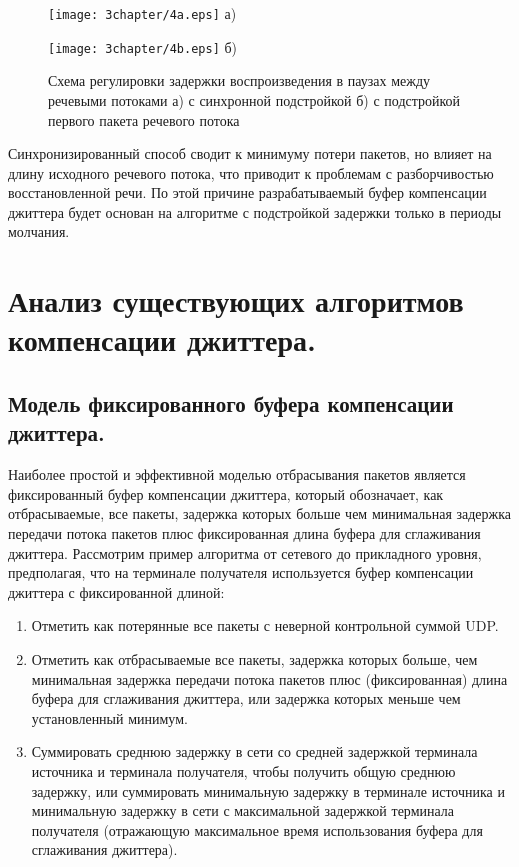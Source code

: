 \begin{figure} [!h]
\begin{minipage}[h]{0.85\linewidth}
\center
\texttt{[image: 3chapter/4a.eps]} а) \\
\end{minipage}
\vfill
\begin{minipage}[h]{0.95\linewidth}
\center
\texttt{[image: 3chapter/4b.eps]} б) \\
\end{minipage}
\caption{Схема регулировки задержки воспроизведения в паузах между речевыми потоками а) с синхронной подстройкой б) с подстройкой первого пакета речевого потока }
\label{img3:manageDelay}
\end{figure}


Синхронизированный способ сводит к минимуму потери пакетов, но влияет на длину исходного речевого потока, что приводит к проблемам с разборчивостью восстановленной речи. По этой причине разрабатываемый буфер компенсации джиттера будет основан на алгоритме с подстройкой задержки только в периоды молчания.


\section{Анализ существующих алгоритмов компенсации джиттера.} \label{sect3_4}
\subsection{Модель фиксированного буфера компенсации джиттера.} \label{sect3_4_1}

Наиболее простой и эффективной моделью отбрасывания пакетов является фиксированный буфер компенсации джиттера, который обозначает, как отбрасываемые, все пакеты, задержка которых больше чем минимальная задержка передачи потока пакетов плюс фиксированная длина буфера для сглаживания джиттера.
Рассмотрим пример алгоритма от сетевого до прикладного уровня, предполагая, что на терминале получателя используется буфер компенсации джиттера с фиксированной длиной:
\begin{enumerate}
\item Отметить как потерянные все пакеты с неверной контрольной суммой UDP.
\item Отметить как отбрасываемые все пакеты, задержка которых больше, чем минимальная задержка передачи потока пакетов плюс (фиксированная) длина буфера для сглаживания джиттера, или задержка которых меньше чем установленный минимум. 
\item Суммировать среднюю задержку в сети со средней задержкой терминала источника и терминала получателя, чтобы получить общую среднюю задержку, или суммировать минимальную задержку в терминале источника и минимальную задержку в сети с максимальной задержкой терминала получателя (отражающую максимальное время использования буфера для сглаживания джиттера).
\end{enumerate}

